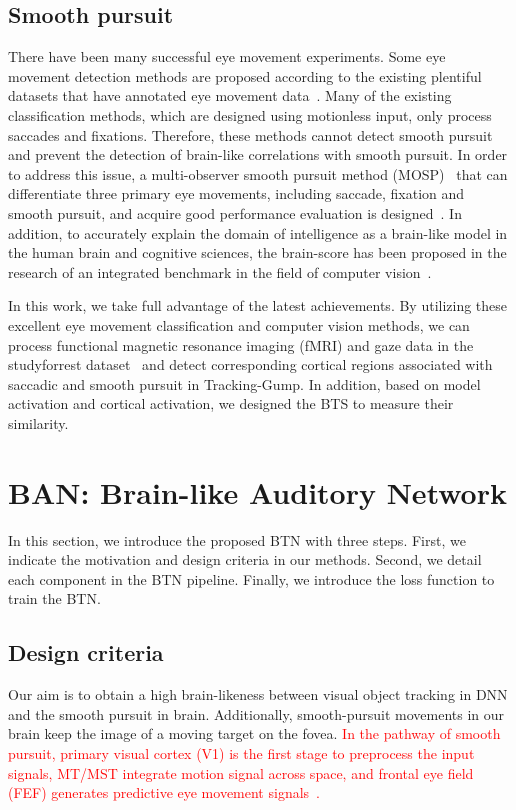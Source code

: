 \documentclass[journal]{IEEEtran}
\begin{document}
\subsection{Smooth pursuit}
There have been many successful eye movement experiments. 
Some eye movement detection methods are proposed according to the existing plentiful datasets that have annotated eye movement data~\cite{dorr2010variability,mathe2012dynamic,hooge2017is,blstm_class}. 
Many of the existing classification methods, which are designed using motionless input, only process saccades and fixations. 
Therefore, these methods cannot detect smooth pursuit and prevent the detection of brain-like correlations with smooth pursuit. 
In order to address this issue, a multi-observer smooth pursuit method (MOSP)~\cite{mosp} that can differentiate three primary eye movements, including saccade, fixation and smooth pursuit, 
and acquire good performance evaluation is designed~\cite{blstm_class}.
In addition, to accurately explain the domain of  intelligence as a brain-like model in the human brain and cognitive sciences, 
the brain-score has been proposed in the research of an integrated benchmark in the field of computer vision~\cite{schrimpf2020integrative}. 

In this work, we take full advantage of the latest achievements. 
By utilizing these excellent eye movement classification and computer vision methods, 
we can process functional magnetic resonance imaging (fMRI) and gaze data in the studyforrest dataset~\cite{gaze_forrest} 
and detect corresponding cortical regions associated with saccadic and smooth pursuit in Tracking-Gump.
In addition, based on model activation and cortical activation, we designed the BTS to measure their similarity.


\section{BAN: Brain-like Auditory Network} 
In this section, we introduce the proposed BTN with three steps. 
First, we indicate the motivation and design criteria in our methods.
Second, we detail each component in the BTN pipeline. 
Finally, we introduce the loss function to train the BTN. \par

\subsection{Design criteria}
Our aim is to obtain a high brain-likeness between visual object tracking in DNN and the smooth pursuit in brain.
Additionally, smooth-pursuit movements in our brain keep the image of a moving target on the fovea. 
\textcolor{red}{
	In the pathway of smooth pursuit,
	primary visual cortex (V1) is the first stage to preprocess the input signals, 
	MT/MST \textcolor{red}{integrate} motion signal across space,
	and frontal eye field (FEF) generates predictive eye movement signals~\cite{b11,b13,b14}.
}\par
\end{document}
